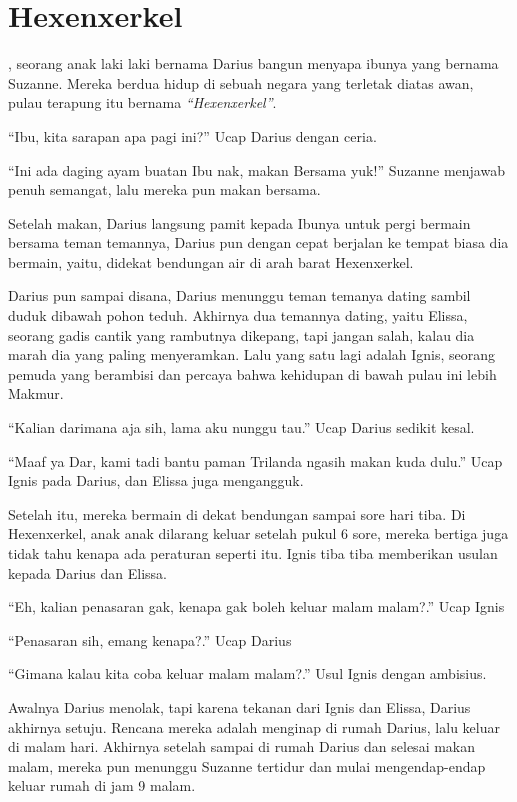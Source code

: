 \chapter*{Hexenxerkel}
, seorang anak laki laki bernama Darius bangun menyapa ibunya yang bernama Suzanne. Mereka berdua hidup di sebuah negara yang terletak diatas awan, pulau terapung itu bernama \textit{``Hexenxerkel''}.


``Ibu, kita sarapan apa pagi ini?'' Ucap Darius dengan ceria.


“Ini ada daging ayam buatan Ibu nak, makan Bersama yuk!” Suzanne menjawab penuh semangat, lalu mereka pun makan bersama.


Setelah makan, Darius langsung pamit kepada Ibunya untuk pergi bermain bersama teman temannya, Darius pun dengan cepat berjalan ke tempat biasa dia bermain, yaitu, didekat bendungan air di arah barat Hexenxerkel.


Darius pun sampai disana, Darius menunggu teman temanya dating sambil duduk dibawah pohon teduh. Akhirnya dua temannya dating, yaitu Elissa, seorang gadis cantik yang rambutnya dikepang, tapi jangan salah, kalau dia marah dia yang paling menyeramkan. Lalu yang satu lagi adalah Ignis, seorang pemuda yang berambisi dan percaya bahwa kehidupan di bawah pulau ini lebih Makmur.


``Kalian darimana aja sih, lama aku nunggu tau.'' Ucap Darius sedikit kesal.


``Maaf ya Dar, kami tadi bantu paman Trilanda ngasih makan kuda dulu.'' Ucap Ignis pada Darius, dan Elissa juga mengangguk.


Setelah itu, mereka bermain di dekat bendungan sampai sore hari tiba. Di Hexenxerkel, anak anak dilarang keluar setelah pukul 6 sore, mereka bertiga juga tidak tahu kenapa ada peraturan seperti itu. Ignis tiba tiba memberikan usulan kepada Darius dan Elissa.

``Eh, kalian penasaran gak, kenapa gak boleh keluar malam malam?.'' Ucap Ignis


``Penasaran sih, emang kenapa?.'' Ucap Darius


``Gimana kalau kita coba keluar malam malam?.'' Usul Ignis dengan ambisius.


Awalnya Darius menolak, tapi karena tekanan dari Ignis dan Elissa, Darius akhirnya setuju. Rencana mereka adalah menginap di rumah Darius, lalu keluar di malam hari. Akhirnya setelah sampai di rumah Darius dan selesai makan malam, mereka pun menunggu Suzanne tertidur dan mulai mengendap-endap keluar rumah di jam 9 malam.


